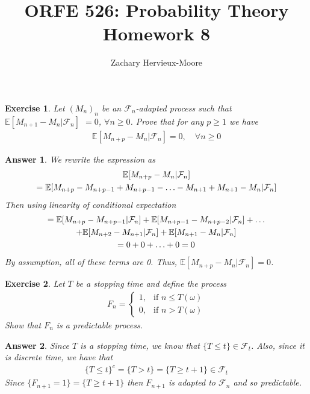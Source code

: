 \documentclass[12pt]{article}
\title{ORFE 526: Probability Theory \\ Homework 8}
\author{Zachary Hervieux-Moore}
\date{\displaydate{date}}
\theoremstyle{colon}
\newtheorem{exercise}{Exercise}
\newtheorem*{answer}{Answer}
\begin{document}
\maketitle

\clearpage

\begin{exercise}
  Let $(M_n)_n$ be an $\mathcal{F}_n$-adapted process such that $\mathbb{E}[M_{n+1} - M_n | \mathcal{F}_n]$ $= 0$, $\forall n \geq 0$. Prove that for any $p \geq 1$ we have
  \begin{gather*}
    \mathbb{E}[M_{n+p} - M_n | \mathcal{F}_n] = 0, \quad \forall n \geq 0
  \end{gather*}
\end{exercise}

\begin{answer}
  We rewrite the expression as
  \begin{gather*}
    \mathbb{E}[M_{n+p} - M_n | \mathcal{F}_n] \\
    = \mathbb{E}[M_{n+p} - M_{n+p-1} + M_{n+p-1} - \mathellipsis - M_{n+1} + M_{n+1} - M_n | \mathcal{F}_n]
  \end{gather*}
  Then using linearity of conditional expectation
  \begin{gather*}
    = \mathbb{E}[M_{n+p} - M_{n+p-1} | \mathcal{F}_n] + \mathbb{E}[M_{n+p-1} - M_{n+p-2} | \mathcal{F}_n] +  \mathellipsis \\
    + \mathbb{E}[M_{n+2}- M_{n+1} | \mathcal{F}_n] + \mathbb{E}[M_{n+1} - M_n | \mathcal{F}_n] \\
    = 0 + 0 + \mathellipsis + 0 = 0
  \end{gather*}
  By assumption, all of these terms are 0. Thus, $\mathbb{E}[M_{n+p} - M_n | \mathcal{F}_n] = 0$.
\end{answer}

\clearpage

\begin{exercise}
  Let $T$ be a stopping time and define the process
  \begin{gather*} F_n =
    \begin{cases}
      1, & \text{if } n \leq T(\omega) \\
      0, & \text{if } n > T(\omega)
    \end{cases}
  \end{gather*}
  Show that $F_n$ is a predictable process.
\end{exercise}

\begin{answer}
  Since $T$ is a stopping time, we know that $\{ T \leq t \} \in \mathcal{F}_t$. Also, since it is discrete time, we have that
  \begin{gather*}
    \{ T \leq t \}^c = \{ T > t \} = \{ T \geq t + 1 \} \in \mathcal{F}_t
  \end{gather*}
  Since $\{ F_{n+1} = 1 \} = \{ T \geq t + 1 \}$ then $F_{n+1}$ is adapted to $\mathcal{F}_n$ and so predictable.
\end{answer}
\end{document}
